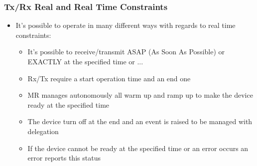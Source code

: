 \begin{frame}[fragile]
  \frametitle{Tx/Rx Real and Real Time Constraints}
  \begin{itemize}
    \item It's possible to operate in many different ways with regards to real time constraints:
    \begin{itemize}
    	\item It's possible to receive/transmit ASAP (As Soon As Possible) or EXACTLY at the specified time or ...
    	\item Rx/Tx require a start operation time and an end one
    	\item MR manages autonomously all warm up and ramp up to make the device ready at the specified time
    	\item The device turn off at the end and an event is raised to be managed with delegation
    	\item If the device cannot be ready at the specified time or an error occurs an error reports this status
    \end{itemize}

  \end{itemize}
\end{frame}
